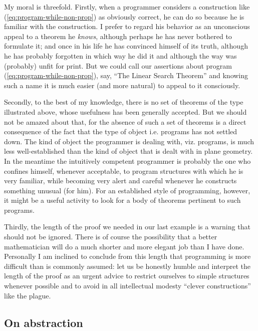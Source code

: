 My moral is threefold. Firstly, when a programmer considers a construction like (\ref{eq:program-while-non-prop}) as obviously correct, he can do so because he is familiar with the construction. I prefer to regard his behavior as an unconscious appeal to a theorem he \textit{knows}, although perhaps he has never bothered to formulate it; and once in his life he has convinced himself of its truth, although he has probably forgotten in which way he did it and although the way was (probably) unfit for print. But we could call our assertions about program (\ref{eq:program-while-non-prop}), say, ``The Linear Search Theorem'' and knowing such a name it is much easier (and more natural) to appeal to it consciously.

Secondly, to the best of my knowledge, there is no set of theorems of the type illustrated above, whose usefulness has been generally accepted. But we should not be amazed about that, for the absence of such a set of theorems is a direct consequence of the fact that the type of object \textemdash{}  i.e. programs \textemdash{}  has not settled down. The kind of object the programmer is dealing with, viz. programs, is much less well-established than the kind of object that is dealt with in plane geometry. In the meantime the intuitively competent programmer is probably the one who confines himself, whenever acceptable, to program structures with which he is very familiar, while becoming very alert and careful whenever he constructs something unusual (for him). For an established style of programming, however, it might be a useful activity to look for a body of theorems pertinent to such programs.

Thirdly, the length of the proof we needed in our last example is a warning that should not be ignored. There is of course the possibility that a better mathematician will do a much shorter and more elegant job than I have done. Personally I am inclined to conclude from this length that programming is more difficult than is commonly assumed: let us be honestly humble and interpret the length of the proof as an urgent advice to restrict ourselves to simple structures whenever possible and to avoid in all intellectual modesty ``clever constructions'' like the plague.

\subsection{On abstraction}

